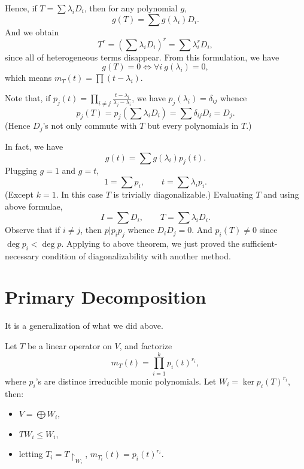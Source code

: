 Hence, if $T = \sum \lambda_i D_i$, then for any polynomial $g$, $$g(T) = \sum g(\lambda_i)D_i.$$ And we obtain $$T^r = \left( \sum \lambda_i D_i\right)^r =  \sum \lambda_i^r D_i ,$$ since all of heterogeneous terms disappear. From this formulation, we have $$g(T) = 0 \Longleftrightarrow \forall i ~ g(\lambda_i) = 0,$$ which means $m_T(t) = \prod (t -\lambda_i).$

Note that, if $p_j(t) = \prod_{i\ne j} \frac{t-\lambda_i}{\lambda_j - \lambda_i}$, we have $p_j(\lambda_i) = \delta_{ij}$ whence $$p_j(T) =p_j \left(\sum \lambda_i D_i \right) = \sum \delta_{ij} D_i= D_j.$$ (Hence $D_j$'s not only commute with $T$ but every polynomials in $T$.) 

In fact, we have $$g(t) = \sum g(\lambda_i)p_j(t).$$ Plugging $g=1$ and $g=t$,
$$1 = \sum p_i,\qquad t = \sum \lambda_i p_i.$$(Except $k=1$. In this case $T$ is trivially diagonalizable.) Evaluating $T$ and using above formulae, $$I = \sum D_i,\qquad T = \sum \lambda_i D_i.$$ Observe that if $i\ne j$, then $p|p_i p_j$ whence $D_iD_j = 0.$ And $p_i(T)\ne 0$ since $\operatorname{deg} p_i < \operatorname{deg}p.$ Applying to above theorem, we just proved the sufficient-necessary condition of diagonalizability with another method.

\section{Primary Decomposition}
It is a generalization of what we did above.
\begin{theorem}Let $T$ be a linear operator on $V$, and factorize $$m_T(t) = \prod_{i=1}^k p_i(t)^{r_i},$$where $p_i$'s are distince irreducible monic polynomials. Let $W_i = \ker p_i(T)^{r_i}$, then:
\begin{itemize}
\item $V = \bigoplus W_i$,
\item $TW_i \le W_i$,
\item letting $T_i = T\upharpoonright _{W_i}$, $m_{T_i}(t) = p_{i}(t)^{r_i}.$
\end{itemize}
\end{theorem}







